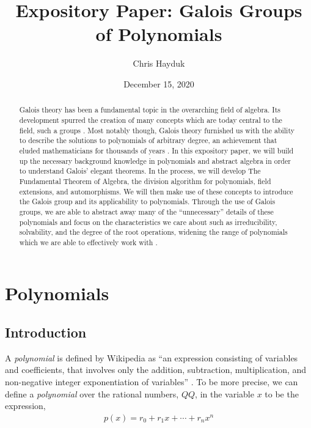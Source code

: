 \documentclass[11pt, a4paper, oneside]{article}
\theoremstyle{plain}
\theoremstyle{plain}
\theoremstyle{plain}
\theoremstyle{plain}
\theoremstyle{definition}
\theoremstyle{example}
\begin{document}
\title{Expository Paper: Galois Groups of Polynomials}
\author{Chris Hayduk}
\date{December 15, 2020}
\maketitle

\begin{abstract}
Galois theory has been a fundamental topic in the overarching field of algebra. Its development spurred the creation of many concepts which are today central to the field, such a groups \cite{jorg, galoiswiki}. Most notably though, Galois theory furnished us with the ability to describe the solutions to polynomials of arbitrary degree, an achievement that eluded mathematicians for thousands of years \cite{jorg}. In this expository paper, we will build up the necessary background knowledge in polynomials and abstract algebra in order to understand Galois' elegant theorems. In the process, we will develop The Fundamental Theorem of Algebra, the division algorithm for polynomials, field extensions, and automorphisms. We will then make use of these concepts to introduce the Galois group and its applicability to polynomials. Through the use of Galois groups, we are able to abstract away many of the ``unnecessary'' details of these polynomials and focus on the characteristics we care about such as irreducibility, solvability, and the degree of the root operations, widening the range of polynomials which we are able to effectively work with \cite{jorg}.
\end{abstract}

\newpage
\section{Polynomials}

\subsection{Introduction}

A \textit{polynomial} is defined by Wikipedia as ``an expression consisting of variables and coefficients, that involves only the addition, subtraction, multiplication, and non-negative integer exponentiation of variables'' \cite{polynomialwiki}. To be more precise, we can define a \textit{polynomial} over the rational numbers, $QQ$, in the variable $x$ to be the expression,
\begin{align*}
p(x) = r_0 + r_1x + \cdots + r_nx^n
\end{align*} 
\end{document}
